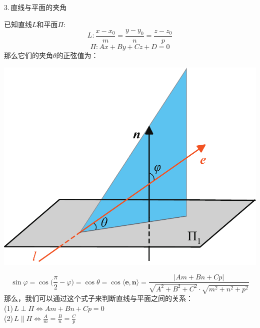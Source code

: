 \noindent
\begin{minipage}{0.7\linewidth}
3.$\,$直线与平面的夹角
\par 已知直线$L$和平面$\Pi$:
\begin{equation}
	\nonumber
	L:\frac{x-x_0}{m}=\frac{y-y_0}{n}=\frac{z-z_0}{p}
\end{equation}
\begin{equation}
	\nonumber
	\Pi:Ax+By+Cz+D=0
\end{equation}
那么它们的夹角$\theta$的正弦值为：
\end{minipage}
\begin{minipage}{0.3\linewidth}
	\centering
	\includegraphics[width = 0.95\linewidth]{pic/C-5/planelineang}
	\vspace*{-1em}
	\label{直线与平面的夹角}
\end{minipage}

\begin{equation}
	\sin \varphi =\cos\bigg( \frac{\pi}{2}-\varphi\bigg)=\cos \theta=\cos \langle \boldsymbol{e},\boldsymbol{n}\rangle =\frac{|Am+Bn+Cp|}{\sqrt{A^2+B^2+C^2}\cdot\sqrt{m^2+n^2+p^2}}
\end{equation}
那么，我们可以通过这个式子来判断直线与平面之间的关系：\\
(1)$\, L\perp \Pi \Leftrightarrow  Am+Bn+Cp=0$\\
(2)$\, L\parallel \Pi \Leftrightarrow \displaystyle \frac{A}{m}=\frac{B}{n}=\frac{C}{p} $
